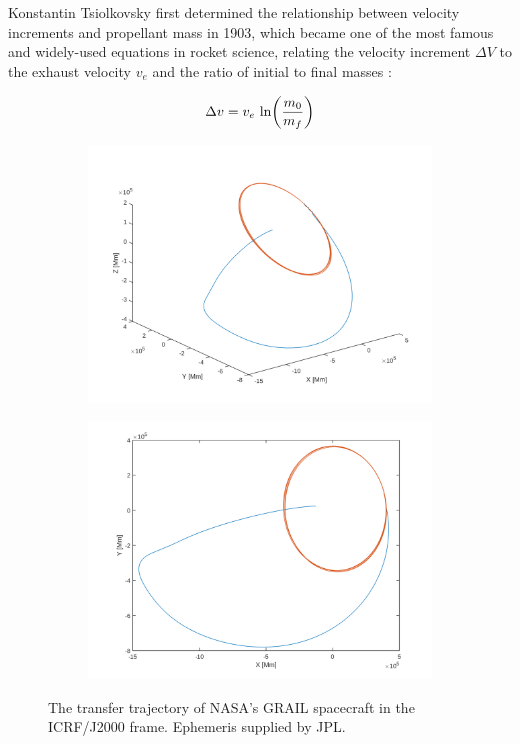 \begin{multicols*}{2}
Konstantin Tsiolkovsky first determined the relationship between velocity increments and propellant mass in 1903, which became one of the most famous and widely-used equations in rocket science, relating the velocity increment $\Delta V$ to the exhaust velocity $v_e$ and the ratio of initial to final masses \citep{Curtis2009}:

\begin{equation}
\Delta v = v_{e}~\textnormal{ln} \bigg( \frac{m_0}{m_f} \bigg)
\label{rocketequation}
\end{equation}

\begin{figure}[ht]
\centering
\begin{subfigure}{.45\textwidth}
\centering
\includegraphics[width=\linewidth]{figures/grail_orbit}
\end{subfigure}%
\begin{subfigure}{.45\textwidth}
\centering
\includegraphics[width=\linewidth]{figures/grail_orbit3}
\end{subfigure}
\caption{The transfer trajectory of NASA's GRAIL spacecraft in the ICRF/J2000 frame. Ephemeris supplied by JPL.}
\label{f:grail}
\end{figure}


\end{multicols*}
